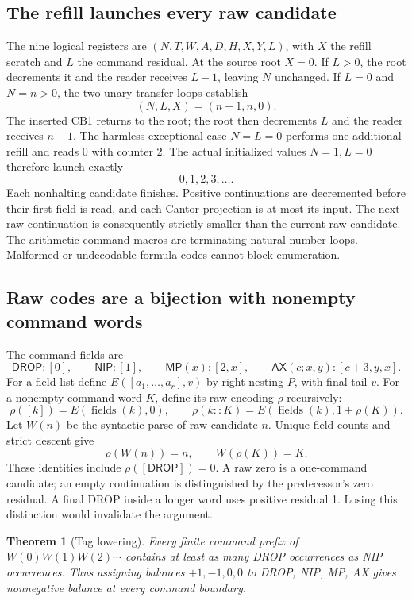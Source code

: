 \documentclass[11pt,a4paper]{article}
\newtheorem{theorem}{Theorem}[section]
\theoremstyle{remark}\newtheorem{remark}[theorem]{Remark}
\newcommand{\D}{\mathsf{DROP}}
\newcommand{\N}{\mathsf{NIP}}
\newcommand{\MP}{\mathsf{MP}}
\newcommand{\AX}{\mathsf{AX}}
\begin{document}
\subsection{The refill launches every raw candidate}

The nine logical registers are $(N,T,W,A,D,H,X,Y,L)$, with $X$ the refill scratch and $L$ the command residual. At the source root $X=0$. If $L>0$, the root decrements it and the reader receives $L-1$, leaving $N$ unchanged. If $L=0$ and $N=n>0$, the two unary transfer loops establish
\[
 (N,L,X)=(n+1,n,0).
\]
The inserted CB1 returns to the root; the root then decrements $L$ and the reader receives $n-1$. The harmless exceptional case $N=L=0$ performs one additional refill and reads 0 with counter 2. The actual initialized values $N=1,L=0$ therefore launch exactly
\[
 0,1,2,3,\ldots.
\]
Each nonhalting candidate finishes. Positive continuations are decremented before their first field is read, and each Cantor projection is at most its input. The next raw continuation is consequently strictly smaller than the current raw candidate. The arithmetic command macros are terminating natural-number loops. Malformed or undecodable formula codes cannot block enumeration.

\subsection{Raw codes are a bijection with nonempty command words}

The command fields are
\[
 \D:[0],\qquad \N:[1],\qquad
 \MP(x):[2,x],\qquad \AX(c;x,y):[c+3,y,x].
\]
For a field list define $E([a_1,\ldots,a_r],v)$ by right-nesting $P$, with final tail $v$. For a nonempty command word $K$, define its raw encoding $\rho$ recursively:
\[
 \rho([k])=E(\operatorname{fields}(k),0),\qquad
 \rho(k::K)=E(\operatorname{fields}(k),1+\rho(K)).
\]
Let $W(n)$ be the syntactic parse of raw candidate $n$. Unique field counts and strict descent give
\[
 \rho(W(n))=n,\qquad W(\rho(K))=K.
\]
These identities include $\rho([\D])=0$. A raw zero is a one-command candidate; an empty continuation is distinguished by the predecessor's zero residual. A final DROP inside a longer word uses positive residual 1. Losing this distinction would invalidate the argument.

\begin{theorem}[Tag lowering]\label{thm:tag}
Every finite command prefix of $W(0)W(1)W(2)\cdots$ contains at least as many DROP occurrences as NIP occurrences. Thus assigning balances $+1,-1,0,0$ to DROP, NIP, MP, AX gives nonnegative balance at every command boundary.
\end{theorem}
\end{document}
